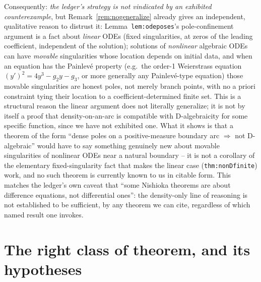 \documentclass[11pt]{article}
\theoremstyle{remark}
\begin{document}
\noindent Consequently: \emph{the ledger's strategy is not vindicated by an exhibited counterexample},
but Remark~\ref{rem:nogeneralize} already gives an independent, qualitative reason to distrust it:
Lemma~\texttt{lem:odeposes}'s pole-confinement argument is a fact about \emph{linear} ODEs (fixed
singularities, at zeros of the leading coefficient, independent of the solution); solutions of
\emph{nonlinear} algebraic ODEs can have \emph{movable} singularities whose location depends on
initial data, and when an equation has the Painlev\'e property (e.g.\ the order-1 Weierstrass equation
$(y')^2=4y^3-g_2y-g_3$, or more generally any Painlev\'e-type equation) those movable singularities are
honest poles, not merely branch points, with no a priori constraint tying their location to a
coefficient-determined finite set. This is a structural reason the linear argument does not
literally generalize; it is not by itself a proof that density-on-an-arc is compatible with
D-algebraicity for some specific function, since we have not exhibited one. What it shows is that a
theorem of the form ``dense poles on a positive-measure boundary arc $\Rightarrow$ not D-algebraic''
would have to say something genuinely new about movable singularities of nonlinear ODEs near a natural
boundary -- it is not a corollary of the elementary fixed-singularity fact that makes the linear case
(\texttt{thm:nonDfinite}) work, and no such theorem is currently known to us in citable form. This
matches the ledger's own caveat that ``some Nishioka theorems are about difference equations, not
differential ones'': the density-only line of reasoning is not established to be sufficient, by any
theorem we can cite, regardless of which named result one invokes.

\section{The right class of theorem, and its hypotheses}\label{sec:realtool}
\end{document}
